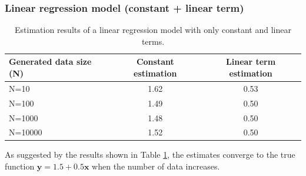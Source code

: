 \documentclass[]{article}
\begin{document}
\subsubsection{Linear regression model (constant + linear term)}


\begin{table}[H]
	\centering
	\caption{Estimation results of a linear regression model with only constant and linear terms.}
	\label{tab:linear}
	\begin{tabular}{@{}lcc@{}}
		\toprule
		Generated data size (N) & Constant estimation & Linear term estimation \\ \midrule
		N=10        & 1.62                & 0.53                   \\
		N=100       & 1.49                & 0.50                   \\
		N=1000      & 1.48                & 0.50                   \\
		N=10000     & 1.52                & 0.50                   \\ \bottomrule
	\end{tabular}
\end{table}


As suggested by the results shown in Table \ref{tab:linear}, the estimates converge to the true function $\mathbf{y}=1.5+0.5\mathbf{x}$ when the number of data increases. 
\end{document}

